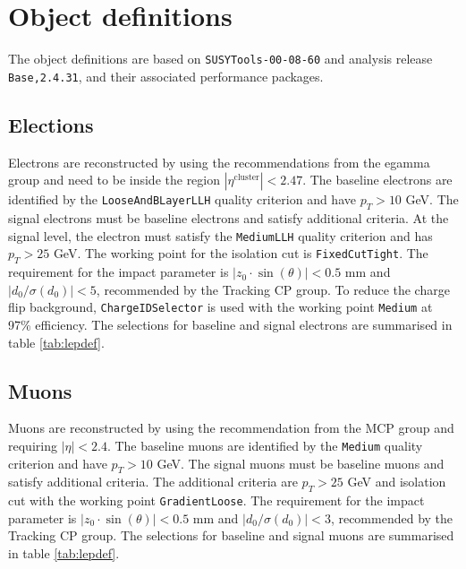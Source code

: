 \section{Object definitions}
\label{sec:object}
The object definitions are based on \texttt{SUSYTools-00-08-60} and analysis release \texttt{Base,2.4.31}, and their associated performance packages.

\subsection{Elections}
Electrons are reconstructed by using the recommendations from the egamma group and need to be inside the region $|\eta^{\text{cluster}}|<2.47$.
The baseline electrons are identified by the \texttt{LooseAndBLayerLLH} quality criterion and have $p_T>10$ GeV.
The signal electrons must be baseline electrons and satisfy additional criteria.
At the signal level, the electron must satisfy the \texttt{MediumLLH} quality criterion and has $p_T>25$ GeV.
The working point for the isolation cut is \texttt{FixedCutTight}.
The requirement for the impact parameter is $|z_0 \cdot \sin (\theta)|< 0.5$ mm and $|d_0/\sigma(d_0)|<5$, recommended by the Tracking CP group.
To reduce the charge flip background, \texttt{ChargeIDSelector} is used with the working point \texttt{Medium} at 97\% efficiency.
The selections for baseline and signal electrons are summarised in table \ref{tab:lepdef}.

\subsection{Muons}
Muons are reconstructed by using the recommendation from the MCP group \cite{muons} and requiring $|\eta|<2.4$.
The baseline muons are identified by the \texttt{Medium} quality criterion and have $p_T>10$ GeV.
The signal muons must be baseline muons and satisfy additional criteria.
The additional criteria are $p_T>25$ GeV and isolation cut with the working point \texttt{GradientLoose}.
The requirement for the impact parameter is $|z_0 \cdot \sin (\theta)|< 0.5$ mm and $|d_0/\sigma(d_0)|<3$, recommended by the Tracking CP group.
The selections for baseline and signal muons are summarised in table \ref{tab:lepdef}.


